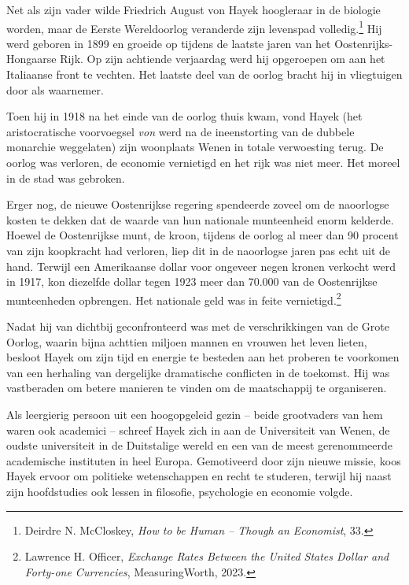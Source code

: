 \documentclass[
  a5paper,
  smalldemyvopaper,11pt,twoside,onecolumn,openright,extrafontsizes,
hidelinks]{memoir}
\begin{document}
Net als zijn vader wilde Friedrich August von Hayek hoogleraar in de
biologie worden, maar de Eerste Wereldoorlog veranderde zijn levenspad
volledig.\footnote{\hspace{0pt}Deirdre N. McCloskey, \emph{How to be
  Human -- Though an Economist}, 33.} Hij werd geboren in 1899 en
groeide op tijdens de laatste jaren van het Oostenrijks-Hongaarse Rijk.
Op zijn achtiende verjaardag werd hij opgeroepen om aan het Italiaanse
front te vechten. Het laatste deel van de oorlog bracht hij in
vliegtuigen door als waarnemer.

Toen hij in 1918 na het einde van de oorlog thuis kwam, vond Hayek (het
aristocratische voorvoegsel \emph{von} werd na de ineenstorting van de
dubbele monarchie weggelaten) zijn woonplaats Wenen in totale
verwoesting terug. De oorlog was verloren, de economie vernietigd en het
rijk was niet meer. Het moreel in de stad was gebroken.

Erger nog, de nieuwe Oostenrijkse regering spendeerde zoveel om de
naoorlogse kosten te dekken dat de waarde van hun nationale munteenheid
enorm kelderde. Hoewel de Oostenrijkse munt, de kroon, tijdens de oorlog
al meer dan 90 procent van zijn koopkracht had verloren, liep dit in de
naoorlogse jaren pas echt uit de hand. Terwijl een Amerikaanse dollar
voor ongeveer negen kronen verkocht werd in 1917, kon diezelfde dollar
tegen 1923 meer dan 70.000 van de Oostenrijkse munteenheden opbrengen.
Het nationale geld was in feite vernietigd.\footnote{\hspace{0pt}Lawrence
  H. Officer, \emph{Exchange Rates Between the United States Dollar and
  Forty-one Currencies}, MeasuringWorth, 2023.}

Nadat hij van dichtbij geconfronteerd was met de verschrikkingen van de
Grote Oorlog, waarin bijna achttien miljoen mannen en vrouwen het leven
lieten, besloot Hayek om zijn tijd en energie te besteden aan het
proberen te voorkomen van een herhaling van dergelijke dramatische
conflicten in de toekomst. Hij was vastberaden om betere manieren te
vinden om de maatschappij te organiseren.

Als leergierig persoon uit een hoogopgeleid gezin -- beide grootvaders
van hem waren ook academici -- schreef Hayek zich in aan de Universiteit
van Wenen, de oudste universiteit in de Duitstalige wereld en een van de
meest gerenommeerde academische instituten in heel Europa. Gemotiveerd
door zijn nieuwe missie, koos Hayek ervoor om politieke wetenschappen en
recht te studeren, terwijl hij naast zijn hoofdstudies ook lessen in
filosofie, psychologie en economie volgde.
\end{document}

